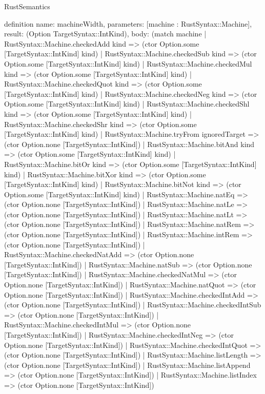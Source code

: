 \begin{lexlean}{RustSemantics}
\begin{semanticmodule}
definition{
  name: machineWidth,
  parameters: [machine : RustSyntax::Machine],
  result: (Option TargetSyntax::IntKind),
  body: (match machine
    | RustSyntax::Machine.checkedAdd kind => (ctor Option.some [TargetSyntax::IntKind] kind)
    | RustSyntax::Machine.checkedSub kind => (ctor Option.some [TargetSyntax::IntKind] kind)
    | RustSyntax::Machine.checkedMul kind => (ctor Option.some [TargetSyntax::IntKind] kind)
    | RustSyntax::Machine.checkedQuot kind => (ctor Option.some [TargetSyntax::IntKind] kind)
    | RustSyntax::Machine.checkedNeg kind => (ctor Option.some [TargetSyntax::IntKind] kind)
    | RustSyntax::Machine.checkedShl kind => (ctor Option.some [TargetSyntax::IntKind] kind)
    | RustSyntax::Machine.checkedShr kind => (ctor Option.some [TargetSyntax::IntKind] kind)
    | RustSyntax::Machine.tryFrom ignoredTarget => (ctor Option.none [TargetSyntax::IntKind])
    | RustSyntax::Machine.bitAnd kind => (ctor Option.some [TargetSyntax::IntKind] kind)
    | RustSyntax::Machine.bitOr kind => (ctor Option.some [TargetSyntax::IntKind] kind)
    | RustSyntax::Machine.bitXor kind => (ctor Option.some [TargetSyntax::IntKind] kind)
    | RustSyntax::Machine.bitNot kind => (ctor Option.some [TargetSyntax::IntKind] kind)
    | RustSyntax::Machine.natEq => (ctor Option.none [TargetSyntax::IntKind])
    | RustSyntax::Machine.natLe => (ctor Option.none [TargetSyntax::IntKind])
    | RustSyntax::Machine.natLt => (ctor Option.none [TargetSyntax::IntKind])
    | RustSyntax::Machine.natRem => (ctor Option.none [TargetSyntax::IntKind])
    | RustSyntax::Machine.intRem => (ctor Option.none [TargetSyntax::IntKind])
    | RustSyntax::Machine.checkedNatAdd => (ctor Option.none [TargetSyntax::IntKind])
    | RustSyntax::Machine.natSub => (ctor Option.none [TargetSyntax::IntKind])
    | RustSyntax::Machine.checkedNatMul => (ctor Option.none [TargetSyntax::IntKind])
    | RustSyntax::Machine.natQuot => (ctor Option.none [TargetSyntax::IntKind])
    | RustSyntax::Machine.checkedIntAdd => (ctor Option.none [TargetSyntax::IntKind])
    | RustSyntax::Machine.checkedIntSub => (ctor Option.none [TargetSyntax::IntKind])
    | RustSyntax::Machine.checkedIntMul => (ctor Option.none [TargetSyntax::IntKind])
    | RustSyntax::Machine.checkedIntNeg => (ctor Option.none [TargetSyntax::IntKind])
    | RustSyntax::Machine.checkedIntQuot => (ctor Option.none [TargetSyntax::IntKind])
    | RustSyntax::Machine.listLength => (ctor Option.none [TargetSyntax::IntKind])
    | RustSyntax::Machine.listAppend => (ctor Option.none [TargetSyntax::IntKind])
    | RustSyntax::Machine.listIndex => (ctor Option.none [TargetSyntax::IntKind])
}
\end{semanticmodule}
\end{lexlean}
